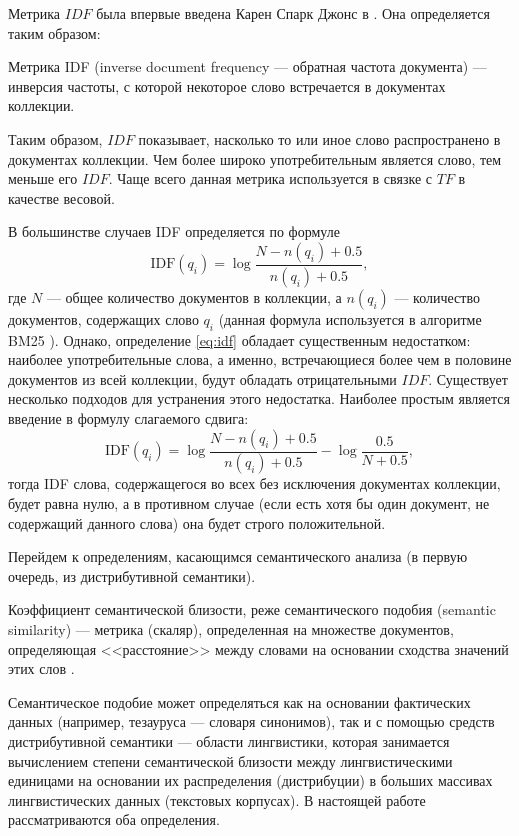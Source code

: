 Метрика $IDF$ была впервые введена Карен Спарк Джонс в \cite{jones2004statistical}. Она определяется таким образом:
\begin{defn}
    Метрика IDF (inverse document frequency --- обратная частота документа) --- инверсия частоты, с которой некоторое слово
    встречается в документах коллекции.
\end{defn}
Таким образом, $IDF$ показывает, насколько то или иное слово распространено в документах коллекции. Чем более широко употребительным
является слово, тем меньше его $IDF$. Чаще всего данная метрика используется в связке с $TF$ в качестве весовой.

В большинстве случаев IDF определяется по формуле
\begin{equation}
    \label{eq:idf}
    \text{IDF}(q_i) = \log \frac{N - n(q_i) + 0.5}{n(q_i) + 0.5},
\end{equation}
где $N$ --- общее количество документов в коллекции, а $n(q_i)$ --- количество документов, содержащих слово $q_i$
(данная формула используется в алгоритме BM25 \cite{Amati2009}). Однако, определение \eqref{eq:idf} обладает существенным недостатком:
наиболее употребительные слова, а именно, встречающиеся более чем в половине документов из всей коллекции, будут обладать
отрицательными $IDF$. Существует несколько подходов для устранения этого недостатка. Наиболее простым является введение в формулу
слагаемого сдвига:
\begin{equation}
    \label{eq:shifted-idf}
    \text{IDF}(q_i) = \log \frac{N - n(q_i) + 0.5}{n(q_i) + 0.5} - \log\frac{0.5}{N + 0.5},
\end{equation}
тогда IDF слова, содержащегося во всех без исключения документах коллекции, будет равна нулю, а в противном случае (если есть
хотя бы один документ, не содержащий данного слова) она будет строго положительной.

Перейдем к определениям, касающимся семантического анализа (в первую очередь, из дистрибутивной семантики).
\begin{defn}
    Коэффициент семантической близости, реже семантического подобия (semantic similarity) --- метрика (скаляр), определенная
    на множестве документов, определяющая <<расстояние>> между словами на основании сходства значений этих слов 
    \cite{Harispe_2015,feng_bagheri_ensan_jovanovic_2017}.
\end{defn}

Семантическое подобие может определяться как на основании фактических данных (например, тезауруса --- словаря синонимов),
так и с помощью средств дистрибутивной семантики --- области лингвистики, которая занимается вычислением степени
семантической близости между лингвистическими единицами на основании их распределения (дистрибуции) в больших массивах
лингвистических данных (текстовых корпусах). В настоящей работе рассматриваются оба определения.

